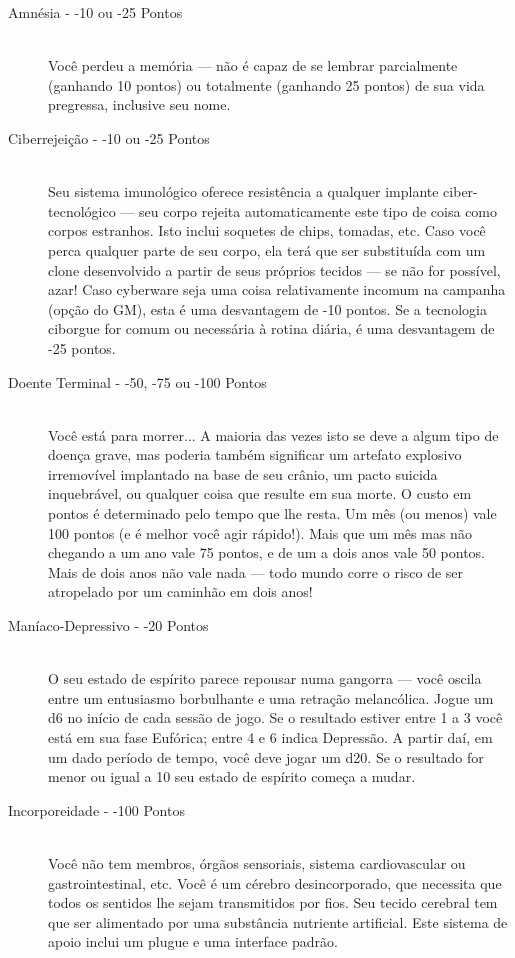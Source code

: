 \documentclass[a4paper]{article}
\begin{document}
\begin{description}
    \item[Amnésia - -10 ou -25 Pontos] \hfill \\ Você perdeu a memória — não é capaz de se lembrar parcialmente (ganhando 10 pontos) ou totalmente (ganhando 25 pontos) de sua vida pregressa, inclusive seu nome.
    
    \item[Ciberrejeição - -10 ou -25 Pontos] \hfill \\ Seu sistema imunológico oferece resistência a qualquer
implante ciber-tecnológico — seu corpo rejeita automaticamente
este tipo de coisa como corpos estranhos. Isto inclui soquetes de
chips, tomadas, etc. Caso você perca qualquer parte de seu
corpo, ela terá que ser substituída com um clone desenvolvido a
partir de seus próprios tecidos — se não for possível, azar!
Caso cyberware seja uma coisa relativamente incomum na
campanha (opção do GM), esta é uma desvantagem de -10
pontos. Se a tecnologia ciborgue for comum ou necessária à
rotina diária, é uma desvantagem de -25 pontos.
        
    \item[Doente Terminal - -50, -75 ou -100 Pontos] \hfill \\ Você está para morrer... A maioria das vezes isto se deve a
algum tipo de doença grave, mas poderia também significar um
artefato explosivo irremovível implantado na base de seu crânio,
um pacto suicida inquebrável, ou qualquer coisa que resulte em
sua morte.
O custo em pontos é determinado pelo tempo que lhe resta.
Um mês (ou menos) vale 100 pontos (e é melhor você agir
rápido!). Mais que um mês mas não chegando a um ano vale 75
pontos, e de um a dois anos vale 50 pontos. Mais de dois anos não
vale nada — todo mundo corre o risco de ser atropelado por um
caminhão em dois anos!

   \item[Maníaco-Depressivo - -20 Pontos] \hfill \\ O seu estado de espírito parece repousar numa gangorra —
você oscila entre um entusiasmo borbulhante e uma retração
melancólica. Jogue um d6 no início de cada sessão de jogo. Se o
resultado estiver entre 1 a 3 você está em sua fase Eufórica; entre
4 e 6 indica Depressão. A partir daí, em um dado período de tempo, você
deve jogar um d20. Se o resultado for menor ou igual a 10 seu estado
de espírito começa a mudar.

    \item[Incorporeidade - -100 Pontos] \hfill \\ Você não tem membros, órgãos sensoriais, sistema
cardiovascular ou gastrointestinal, etc. Você é um cérebro
desincorporado, que necessita que todos os sentidos lhe sejam
transmitidos por fios. Seu tecido cerebral tem que ser alimentado
por uma substância nutriente artificial. Este sistema de apoio inclui um plugue e uma interface padrão.


\end{description}
\end{document}
